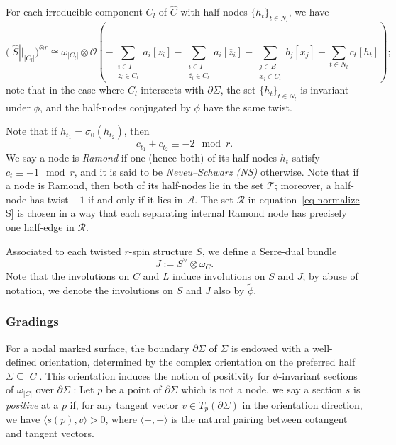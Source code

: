 \documentclass[11pt]{amsart}
\theoremstyle{definition}
\theoremstyle{remark}
\newcommand{\<}{\left<}
\renewcommand{\>}{\right>}
\numberwithin{equation}{section}
\begin{document}
For each irreducible component $C_l$ of $\widehat{C}$ with half-nodes $\{h_t\}_{t \in N_l}$, we %
have
$$\bigg(|\widehat{S}|\big|_{|C_l|}\bigg)^{\otimes r} \cong \omega_{|C_l|} \otimes {\mathcal{O}}\left(-\sum_{\substack{i \in I\\z_i\in C_l}} a_i[z_i] - \sum_{\substack{i \in I\\ \overline{z_i}\in C_l}} a_i [\overline{z}_i] - \sum_{\substack{j \in B\\ x_j\in C_l}} b_j[x_j] - \sum_{t \in N_l} c_t [h_t]\right);$$
note %
that in the case where $C_l$ intersects with $\partial \Sigma$, the set $\{h_t\}_{t \in N_l}$ is invariant under $\phi$, and the half-nodes conjugated by $\phi$ have the same twist.


Note that if $h_{t_1}=\sigma_0(h_{t_2})$, then
\begin{equation}\label{eq sum of twist at node}c_{t_1} + c_{t_2} \equiv -2 \mod r.\end{equation}
We say a node is \textit{Ramond} if one (hence both) of its half-nodes $h_t$ satisfy $c_t \equiv -1 \mod r$,  and it is said to be \textit{Neveu--Schwarz (NS)} otherwise. Note that if a node is Ramond, then both of its half-nodes lie in the set $\mathcal T$; moreover, a half-node has twist $-1$ if and only if it lies in $\mathcal A$. The set $\mathcal{R}$ in equation~\eqref{eq normalize S} is chosen in a way that each separating internal Ramond node has precisely
one half-edge in $\mathcal{R}.$ 


Associated to each twisted $r$-spin structure $S$, we define a Serre-dual bundle \begin{equation}\label{def of J}
    J:=S^{\vee} \otimes \omega_{C}.
\end{equation}
Note that the involutions on $C$ and $L$ induce involutions on $S$ and $J$; by abuse of notation, we denote the involutions on $S$ and $J$ also by $\widetilde{\phi}$.


\subsubsection{Gradings}
For a nodal marked surface, the boundary ${\partial}\Sigma$ of $\Sigma$ is endowed with a well-defined orientation, determined by the complex orientation on the preferred half $\Sigma \subseteq |C|$. This orientation induces the notion of positivity for $\phi$-invariant sections of $\omega_{|C|}$ over ${\partial} \Sigma$%
: Let $p$ %
be a point of $\partial \Sigma$ which is not a node, we say a section $s$ is \textit{positive} at a $p$ if, for any tangent vector $v \in T_p({\partial} \Sigma)$ in the orientation direction, we have $\langle s(p), v \rangle > 0$, where $\langle -, - \rangle$ is the natural pairing between cotangent and tangent vectors.
\end{document}
